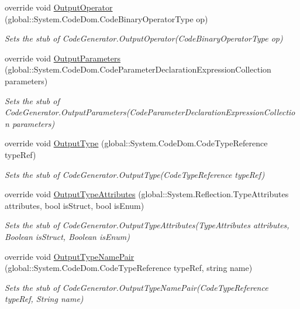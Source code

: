 \begin{DoxyCompactItemize}
override void \hyperlink{class_system_1_1_code_dom_1_1_compiler_1_1_fakes_1_1_stub_code_compiler_a3bf92eb4f3cb7bdd4b8a034b5c90660f}{Output\-Operator} (global\-::\-System.\-Code\-Dom.\-Code\-Binary\-Operator\-Type op)
\begin{DoxyCompactList}\small\item\em Sets the stub of Code\-Generator.\-Output\-Operator(\-Code\-Binary\-Operator\-Type op)\end{DoxyCompactList}\item 
override void \hyperlink{class_system_1_1_code_dom_1_1_compiler_1_1_fakes_1_1_stub_code_compiler_a4369856e0ba416dd5af29871944a0b1d}{Output\-Parameters} (global\-::\-System.\-Code\-Dom.\-Code\-Parameter\-Declaration\-Expression\-Collection parameters)
\begin{DoxyCompactList}\small\item\em Sets the stub of Code\-Generator.\-Output\-Parameters(\-Code\-Parameter\-Declaration\-Expression\-Collection parameters)\end{DoxyCompactList}\item 
override void \hyperlink{class_system_1_1_code_dom_1_1_compiler_1_1_fakes_1_1_stub_code_compiler_a413d327525771c8d839e0019c0d53f02}{Output\-Type} (global\-::\-System.\-Code\-Dom.\-Code\-Type\-Reference type\-Ref)
\begin{DoxyCompactList}\small\item\em Sets the stub of Code\-Generator.\-Output\-Type(\-Code\-Type\-Reference type\-Ref)\end{DoxyCompactList}\item 
override void \hyperlink{class_system_1_1_code_dom_1_1_compiler_1_1_fakes_1_1_stub_code_compiler_abbf5f3ecc236a277605e78dbc6a6c306}{Output\-Type\-Attributes} (global\-::\-System.\-Reflection.\-Type\-Attributes attributes, bool is\-Struct, bool is\-Enum)
\begin{DoxyCompactList}\small\item\em Sets the stub of Code\-Generator.\-Output\-Type\-Attributes(\-Type\-Attributes attributes, Boolean is\-Struct, Boolean is\-Enum)\end{DoxyCompactList}\item 
override void \hyperlink{class_system_1_1_code_dom_1_1_compiler_1_1_fakes_1_1_stub_code_compiler_a393254fb244dad61e793cd21dbf1ad32}{Output\-Type\-Name\-Pair} (global\-::\-System.\-Code\-Dom.\-Code\-Type\-Reference type\-Ref, string name)
\begin{DoxyCompactList}\small\item\em Sets the stub of Code\-Generator.\-Output\-Type\-Name\-Pair(\-Code\-Type\-Reference type\-Ref, String name)\end{DoxyCompactList}\item 

\end{DoxyCompactItemize}
